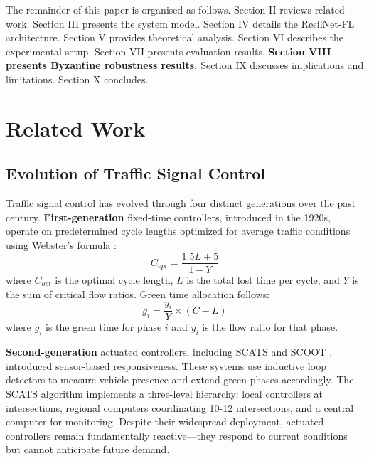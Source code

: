 \documentclass[conference]{IEEEtran}
\begin{document}
The remainder of this paper is organised as follows. Section II reviews related work. Section III presents the system model. Section IV details the ResilNet-FL architecture. Section V provides theoretical analysis. Section VI describes the experimental setup. Section VII presents evaluation results. \textbf{Section VIII presents Byzantine robustness results.} Section IX discusses implications and limitations. Section X concludes.

\section{Related Work}

\subsection{Evolution of Traffic Signal Control}
Traffic signal control has evolved through four distinct generations over the past century. \textbf{First-generation} fixed-time controllers, introduced in the 1920s, operate on predetermined cycle lengths optimized for average traffic conditions using Webster's formula \cite{webster1958}:
\begin{equation}
C_{opt} = \frac{1.5L + 5}{1 - Y}
\end{equation}
where $C_{opt}$ is the optimal cycle length, $L$ is the total lost time per cycle, and $Y$ is the sum of critical flow ratios. Green time allocation follows:
\begin{equation}
g_i = \frac{y_i}{Y} \times (C - L)
\end{equation}
where $g_i$ is the green time for phase $i$ and $y_i$ is the flow ratio for that phase.

\textbf{Second-generation} actuated controllers, including SCATS \cite{sims1980} and SCOOT \cite{hunt1981}, introduced sensor-based responsiveness. These systems use inductive loop detectors to measure vehicle presence and extend green phases accordingly. The SCATS algorithm implements a three-level hierarchy: local controllers at intersections, regional computers coordinating 10-12 intersections, and a central computer for monitoring. Despite their widespread deployment, actuated controllers remain fundamentally reactive---they respond to current conditions but cannot anticipate future demand.
\end{document}
